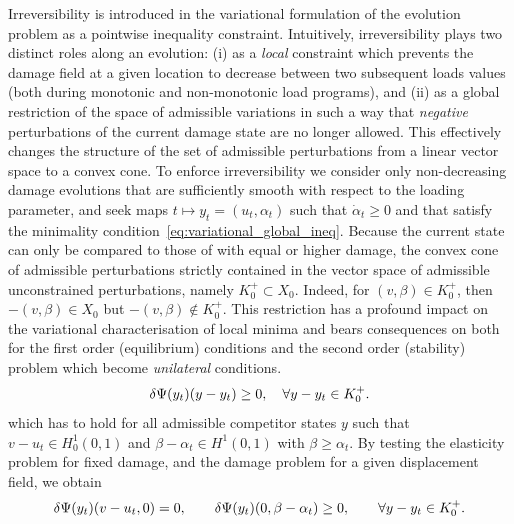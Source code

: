 Irreversibility is introduced in the variational formulation of the evolution problem as a pointwise inequality constraint. Intuitively, irreversibility plays two distinct roles along an evolution: (i) as a \emph{local} constraint which prevents the damage field at a given location to decrease between two subsequent loads values (both during monotonic and non-monotonic load programs), and (ii) as a global restriction of the space of admissible variations in such a way that \emph{negative} perturbations of the current damage state are no longer allowed. This effectively changes the structure of the set of admissible perturbations from a linear vector space to a convex cone. 
To enforce irreversibility we consider only non-decreasing damage evolutions that are sufficiently smooth with respect to the loading parameter, and seek maps $t\mapsto y_t = (u_t, \alpha_t)$ such that $\dot \alpha_t \geq 0$ and that satisfy the minimality condition~\eqref{eq:variational_global_ineq}.
Because the current state can only be compared to those of with equal or higher damage, the convex cone of admissible perturbations strictly contained in the vector space of admissible unconstrained perturbations, namely $K^+_0\subset X_0$. Indeed, for $(v, \beta)\in K^+_0$, then $-(v, \beta) \in X_0$ but $-(v, \beta)\notin K^+_0$. This restriction has a profound impact on the variational characterisation of local minima and bears consequences on both for the first order (equilibrium) conditions and the second order (stability) problem which become \emph{unilateral} conditions.
\begin{equation}
    \label{eq:eq_variational_inequality_full}
    \delta \Psi(y_t)(y-y_t) \geq 0, \quad \forall y-y_t \in K^+_0.
\end{equation}
% 
which has to hold for all admissible competitor states $y$ such that $v-u_t \in H^1_0(0, 1)$ and $\beta-\alpha_t\in H^1(0,1)$ with $\beta \geq \alpha_t$.
By testing the elasticity problem for fixed damage, and the damage problem for a given displacement field, we obtain 
\begin{equation}
    \label{eq:variational_equilibrium} 
    \delta \Psi(y_t)(v-u_t, 0) = 0, \qquad \delta \Psi(y_t)(0, \beta-\alpha_t) \geq 0, \qquad \forall y-y_t \in K^+_{0}.
\end{equation}

